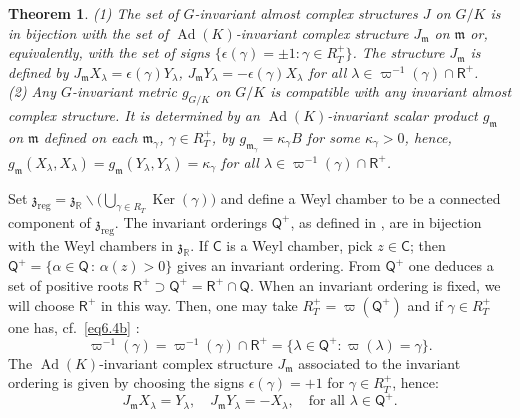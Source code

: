 \documentclass[a4paper,reqno]{amsart}
\newtheorem{thm}{Theorem}[section]
\theoremstyle{definition}
\theoremstyle{remark}
\theoremstyle{plain}
\numberwithin{equation}{section}
\newcommand{\R}{{\mathbb{R}}}
\newcommand{\fm}{{\mathfrak{m}}}
\newcommand{\fz}{{\mathfrak{z}}}
\def\Ker{\operatorname {Ker}}
\DeclareMathOperator{\Ad}{{Ad}}
\newcommand{\sminus}{{\smallsetminus}}
\newcommand{\roots}{\mathsf{R}}
\newcommand{\proots}{\mathsf{R}^+}
\newcommand{\rootsQ}{\mathsf{Q}}
\newcommand{\prootsQ}{\mathsf{Q}^+}
\newcommand{\reg}{{\mathrm{reg}}}
\begin{document}
\begin{thm}
  \label{thm6.7}
  {\rm (1)}
  The set of $G$-invariant almost complex structures $J$ on $G/K$
  is in bijection with the set of $ \Ad(K)$-invariant complex
  structure $J_\fm$ on $\fm$ or, equivalently, with the set of
  signs $\{\epsilon(\gamma) = \pm 1 : \gamma \in R_T^+\}$. The
  structure $J_\fm$ is defined by
  $J_\fm X_\lambda = \epsilon(\gamma) Y_\lambda$,
  $J_\fm Y_\lambda= - \epsilon(\gamma) X_\lambda$ for all
  $\lambda \in \varpi^{-1}(\gamma)\cap \proots$.
  \\
  {\rm (2)} Any $G$-invariant metric $g_{\scriptscriptstyle{G/K}}$ on $G/K$ is
  compatible with any invariant almost complex structure. It is determined
  by an $\Ad(K)$-invariant scalar product $g_\fm$ on $\fm$
  defined on each $\fm_\gamma$, $\gamma \in R_T^+$, by $g_{\fm_\gamma} =
  \kappa_\gamma B$ for some  $\kappa_\gamma >0$, hence,  $g_{\fm} (X_\lambda,X_\lambda) = g_{\fm} (Y_\lambda,Y_\lambda)
=\kappa_\gamma$  for all $\lambda  \in  \varpi^{-1}(\gamma)
  \cap \proots$.
\end{thm}

Set
$\fz_{\reg} = \fz_\R \sminus \bigl(\bigcup_{\gamma \in R_T}
\Ker(\gamma)\bigr)$ and define a Weyl chamber to be a connected
component of $\fz_\reg$.  The invariant orderings $\prootsQ$, as
defined in \cite[Chapter~7, \S 7]{Arv}, are in bijection with the
Weyl chambers in $\fz_\R$.  If $\mathsf{C}$ is a Weyl chamber,
pick $z \in \mathsf{C}$; then
$\prootsQ= \{\alpha \in \rootsQ \, : \, \alpha(z) >0\}$ gives an
invariant ordering. From $\prootsQ$ one deduces a set of positive
roots $\proots \supset \prootsQ = \proots \cap \rootsQ$. When an
invariant ordering is fixed, we will choose $\proots$ in this
way. Then, one may take $R_T^+=\varpi(\prootsQ)$ and if
$\gamma \in R_T^+$ one has, cf.~\eqref{eq6.4b} :
\[
  \varpi^{-1}(\gamma)= \varpi^{-1} (\gamma)\cap  \proots = \{\lambda \in \prootsQ : \varpi(\lambda) =
  \gamma\}.
\]
The $\Ad(K)$-invariant complex structure $J_\fm$ associated
to the invariant ordering is given by choosing the signs
$\epsilon(\gamma) = +1$ for $\gamma \in R_T^+$, hence:
\begin{equation} \label{Qstructure}
J_\fm X_\lambda= Y_\lambda, \quad J_\fm Y_\lambda = - X_\lambda, \quad
\text{for all $\lambda \in \prootsQ$}.
\end{equation}
\end{document}
